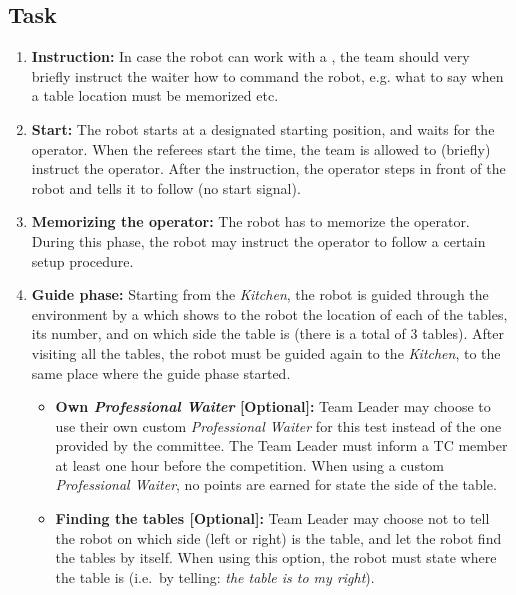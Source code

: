 \subsection{Task}
\begin{enumerate}
	\item \textbf{Instruction:} In case the robot can work with a , the team should very briefly instruct the waiter how to command the robot, e.g. what to say when a table location must be memorized etc.
	
	\item \textbf{Start:} The robot starts at a designated starting position, and waits for the  operator. When the referees start the time, the team is allowed to (briefly) instruct the operator. After the instruction, the operator steps in front of the robot and tells it to follow (no start signal).

	\item \textbf{Memorizing the operator:} The robot has to memorize the operator. During this phase, the robot may instruct the operator to follow a certain setup procedure.

	\item \textbf{Guide phase:} Starting from the \textit{Kitchen}, the robot is guided through the environment by a  which shows to the robot the location of each of the tables, its number, and on which side the table is (there is a total of 3 tables). After visiting all the tables, the robot must be guided again to the \textit{Kitchen}, to the same place where the guide phase started.

	\begin{itemize}
		\item \textbf{Own \textit{Professional Waiter} [Optional]:} Team Leader may choose to use their own custom \textit{Professional Waiter} for this test instead of the one provided by the committee. The Team Leader must inform a TC member at least one hour before the competition. When using a custom \textit{Professional Waiter}, no points are earned for state the side of the table.
		\item \textbf{Finding the tables [Optional]:} Team Leader may choose not to tell the robot on which side (left or right) is the table, and let the robot find the tables by itself. When using this option, the robot must state where the table is (i.e.~by telling: \textit{the table is to my right}).
	\end{itemize}


\end{enumerate}
